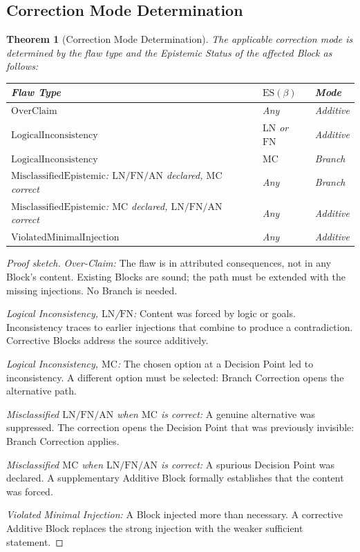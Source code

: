 \documentclass[12pt, a4paper]{article}
\theoremstyle{plain}
\newtheorem{theorem}{Theorem}[section]
\theoremstyle{definition}
\theoremstyle{remark}
\newcommand{\ES}[1]{\mathrm{ES}(#1)}
\newcommand{\LN}{\mathrm{LN}}
\newcommand{\FN}{\mathrm{FN}}
\newcommand{\AN}{\mathrm{AN}}
\newcommand{\MC}{\mathrm{MC}}
\begin{document}
\subsection{Correction Mode Determination}
\label{subsec:mode-det}

\begin{theorem}[Correction Mode Determination]
\label{thm:mode}
The applicable correction mode is determined by the flaw type and the
Epistemic Status of the affected Block as follows:

\medskip
\begin{center}
\begin{tabular}{p{6cm}p{2.2cm}p{2cm}}
\toprule
Flaw Type & $\ES{\beta}$ & Mode \\
\midrule
$\mathrm{OverClaim}$ & Any & Additive \\
$\mathrm{LogicalInconsistency}$ & $\LN$ or $\FN$ & Additive \\
$\mathrm{LogicalInconsistency}$ & $\MC$ & Branch \\
$\mathrm{MisclassifiedEpistemic}$:
  $\LN/\FN/\AN$ declared, $\MC$ correct & Any & Branch \\
$\mathrm{MisclassifiedEpistemic}$:
  $\MC$ declared, $\LN/\FN/\AN$ correct & Any & Additive \\
$\mathrm{ViolatedMinimalInjection}$ & Any & Additive \\
\bottomrule
\end{tabular}
\end{center}
\end{theorem}

\begin{proof}[Proof sketch]
\emph{Over-Claim:} The flaw is in attributed consequences, not in any
Block's content. Existing Blocks are sound; the path must be extended
with the missing injections. No Branch is needed.

\emph{Logical Inconsistency, $\LN$/$\FN$:} Content was forced by
logic or goals. Inconsistency traces to earlier injections that
combine to produce a contradiction. Corrective Blocks address the
source additively.

\emph{Logical Inconsistency, $\MC$:} The chosen option at a Decision
Point led to inconsistency. A different option must be selected:
Branch Correction opens the alternative path.

\emph{Misclassified $\LN/\FN/\AN$ when $\MC$ is correct:} A genuine
alternative was suppressed. The correction opens the Decision Point
that was previously invisible: Branch Correction applies.

\emph{Misclassified $\MC$ when $\LN/\FN/\AN$ is correct:} A spurious
Decision Point was declared. A supplementary Additive Block formally
establishes that the content was forced.

\emph{Violated Minimal Injection:} A Block injected more than
necessary. A corrective Additive Block replaces the strong injection
with the weaker sufficient statement.
\end{proof}
\end{document}
